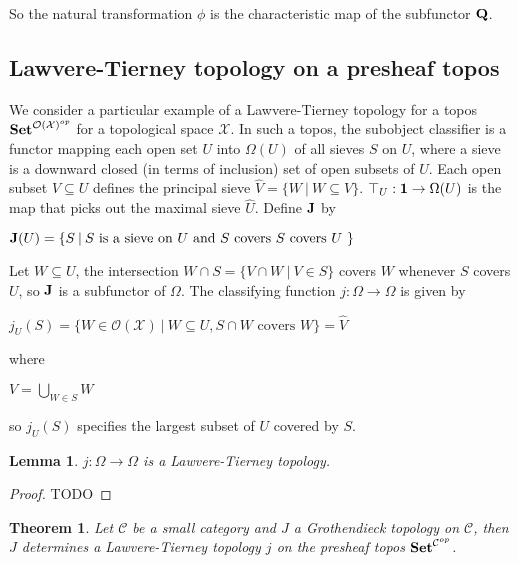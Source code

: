 \documentclass[a4paper]{article}
\theoremstyle{defin}
\theoremstyle{theorem}
\newtheorem{theorem}{Theorem}
\theoremstyle{claim}
\theoremstyle{prop}
\theoremstyle{lemma}
\newtheorem{lemma}{Lemma}
\theoremstyle{fact}
\theoremstyle{ex}
\theoremstyle{col}
\begin{document}
\centerline{
}
So the natural transformation $\phi$ is the characteristic map of the subfunctor ${\bf Q}$.

\subsection{Lawvere-Tierney topology on a presheaf topos}

We consider a particular example of a Lawvere-Tierney topology for a topos ${\bf Set}^{\mathcal{O}(\mathcal{X})^{op}}$ for a topological space $\mathcal{X}$. In such a topos, the subobject classifier is a functor mapping each open set $U$ into $\Omega(U)$ of all sieves $S$ on $U$, where a sieve is a downward closed (in terms of inclusion) set of open subsets of $U$. Each open subset $V \subseteq U$ defines the principal sieve $\hat{V} = \{ W \: | \: W \subseteq V \}$. $\top_U : {\bf 1} \to \Omega(U)$ is the map that picks out the maximal sieve $\hat{U}$. Define ${\bf J}$ by

\begin{center}
${\bf J}(U) = \{ S \: | \: \text{$S$ is a sieve on $U$ and $S$ covers $S$ covers $U$ }\}$
\end{center}

Let $W \subseteq U$, the intersection $W \cap S = \{ V \cap W \: | \: V \in S \}$ covers $W$ whenever $S$ covers $U$, so ${\bf J}$ is a subfunctor of $\Omega$. The classifying function $j : \Omega \to \Omega$ is given by
\begin{center}
$j_U(S) = \{ W \in \mathcal{O}(\mathcal{X}) \: | \: W \subseteq U, \text{$S \cap W$ covers $W$}\} = \hat{V}$
\end{center}
where
\begin{center}
$V = \bigcup \limits_{W \in S} W$
\end{center}
so $j_U(S)$ specifies the largest subset of $U$ covered by $S$.

\begin{lemma}
$j : \Omega \to \Omega$ is a Lawvere-Tierney topology.
\end{lemma}

\begin{proof}
TODO
\end{proof}

\begin{theorem}
Let $\mathcal{C}$ be a small category and $J$ a Grothendieck topology on $\mathcal{C}$, then $J$ determines a Lawvere-Tierney topology $j$ on the presheaf topos ${\bf Set}^{\mathcal{C}^{op}}$.
\end{theorem}
\end{document}
